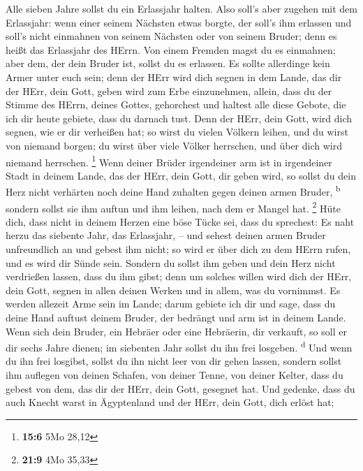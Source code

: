  Alle sieben Jahre sollst du ein Erlassjahr halten.
 Also soll's aber zugehen mit dem Erlassjahr: wenn einer
seinem Nächsten etwas borgte, der soll's ihm erlassen und soll's nicht
einmahnen von seinem Nächsten oder von seinem Bruder; denn es heißt das
Erlassjahr des HErrn.  Von einem Fremden magst du es
einmahnen; aber dem, der dein Bruder ist, sollst du es erlassen.
 Es sollte allerdinge kein Armer unter euch sein; denn der
HErr wird dich segnen in dem Lande, das dir der HErr, dein Gott, geben
wird zum Erbe einzunehmen,  allein, dass du der Stimme des
HErrn, deines Gottes, gehorchest und haltest alle diese Gebote, die ich
dir heute gebiete, dass du darnach tust.  Denn der HErr,
dein Gott, wird dich segnen, wie er dir verheißen hat; so wirst du
vielen Völkern leihen, und du wirst von niemand borgen; du wirst über
viele Völker herrschen, und über dich wird niemand herrschen.
\footnote{\textbf{15:6} 5Mo 28,12}  Wenn deiner Brüder
irgendeiner arm ist in irgendeiner Stadt in deinem Lande, das der HErr,
dein Gott, dir geben wird, so sollst du dein Herz nicht verhärten noch
deine Hand zuhalten gegen deinen armen Bruder, \textsuperscript{b}
 sondern sollst sie ihm auftun und ihm leihen, nach dem er
Mangel hat. \footnote{\textbf{21:9} 4Mo 35,33}  Hüte dich,
dass nicht in deinem Herzen eine böse Tücke sei, dass du sprechest: Es
naht herzu das siebente Jahr, das Erlassjahr, -- und sehest deinen armen
Bruder unfreundlich an und gebest ihm nicht; so wird er über dich zu dem
HErrn rufen, und es wird dir Sünde sein.  Sondern du
sollst ihm geben und dein Herz nicht verdrießen lassen, dass du ihm
gibst; denn um solches willen wird dich der HErr, dein Gott, segnen in
allen deinen Werken und in allem, was du vornimmst.  Es
werden allezeit Arme sein im Lande; darum gebiete ich dir und sage, dass
du deine Hand auftust deinem Bruder, der bedrängt und arm ist in deinem
Lande.  Wenn sich dein Bruder, ein Hebräer oder eine
Hebräerin, dir verkauft, so soll er dir sechs Jahre dienen; im siebenten
Jahr sollst du ihn frei losgeben. \textsuperscript{d} 
Und wenn du ihn frei losgibst, sollst du ihn nicht leer von dir gehen
lassen,  sondern sollst ihm auflegen von deinen Schafen,
von deiner Tenne, von deiner Kelter, dass du gebest von dem, das dir der
HErr, dein Gott, gesegnet hat.  Und gedenke, dass du auch
Knecht warst in Ägyptenland und der HErr, dein Gott, dich erlöst hat;
